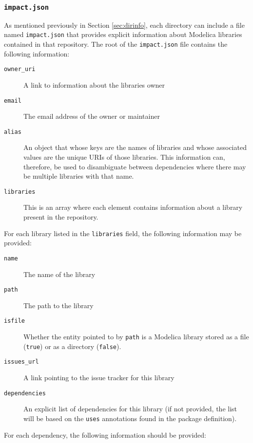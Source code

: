 \documentclass[11pt,a4paper,twocolumn]{article}
\newcommand{\code}[1]{\texttt{#1}} %
\begin{document}
\subsubsection{\code{impact.json}}
\label{sec:dirinfo_schema}

As mentioned previously in Section \ref{sec:dirinfo}, each directory
can include a file named \code{impact.json} that provides explicit
information about Modelica libraries contained in that repository.
The root of the \code{impact.json} file contains the following
information:

\begin{description}
  \item[\code{owner\_uri}] A link to information about the libraries
    owner
  \item[\code{email}] The email address of the owner or maintainer
  \item[\code{alias}] An object that whose keys are the names of
    libraries and whose associated values are the unique URIs of those
    libraries.  This information can, therefore, be used to
    disambiguate between dependencies where there may be multiple
    libraries with that name.
  \item[\code{libraries}] This is an array where each element contains
    information about a library present in the repository.
\end{description}

For each library listed in the \code{libraries} field, the following
information may be provided:

\begin{description}
  \item[\code{name}] The name of the library
  \item[\code{path}] The path to the library
  \item[\code{isfile}] Whether the entity pointed to by \code{path} is
    a Modelica library stored as a file (\code{true}) or as a
    directory (\code{false}).
  \item[\code{issues\_url}] A link pointing to the issue tracker for
    this library
  \item[\code{dependencies}] An explicit list of dependencies for this
    library (if not provided, the list will be based on the
    \code{uses} annotations found in the package definition).
\end{description}

For each dependency, the following information should be provided:
\end{document}
